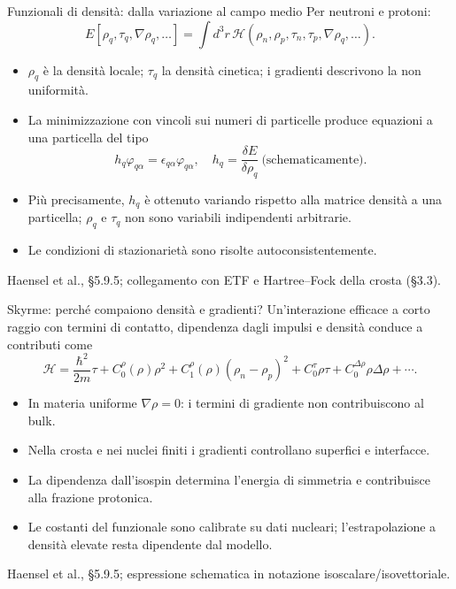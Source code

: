 \begin{frame}[t]{Funzionali di densità: dalla variazione al campo medio}
\small
Per neutroni e protoni:
\[
E[\rho_q,\tau_q,\nabla\rho_q,\ldots]
=\int d^3r\,\mathcal H(\rho_n,\rho_p,\tau_n,\tau_p,\nabla\rho_q,\ldots).
\]
\begin{itemize}
\item $\rho_q$ è la densità locale; $\tau_q$ la densità cinetica; i gradienti descrivono la non uniformità.
\item La minimizzazione con vincoli sui numeri di particelle produce equazioni a una particella del tipo
\[
h_q\varphi_{q\alpha}=\epsilon_{q\alpha}\varphi_{q\alpha},
\quad h_q=\frac{\delta E}{\delta \rho_q}\ \text{(schematicamente)}.
\]
\item Più precisamente, $h_q$ è ottenuto variando rispetto alla matrice densità a una particella; $\rho_q$ e $\tau_q$ non sono variabili indipendenti arbitrarie.
\item Le condizioni di stazionarietà sono risolte autoconsistentemente.
\end{itemize}
{\footnotesize Haensel et al., §5.9.5; collegamento con ETF e Hartree--Fock della crosta (§3.3).}
\end{frame}

\begin{frame}[t]{Skyrme: perché compaiono densità e gradienti?}
\small
Un'interazione efficace a corto raggio con termini di contatto, dipendenza dagli impulsi e densità conduce a contributi come
\[
\mathcal H=\frac{\hbar^2}{2m}\tau
+C_0^\rho(\rho)\rho^2+C_1^\rho(\rho)(\rho_n-\rho_p)^2
+C_0^\tau\rho\tau+C_0^{\Delta\rho}\rho\Delta\rho+\cdots .
\]
\begin{itemize}
\item In materia uniforme $\nabla\rho=0$: i termini di gradiente non contribuiscono al bulk.
\item Nella crosta e nei nuclei finiti i gradienti controllano superfici e interfacce.
\item La dipendenza dall'isospin determina l'energia di simmetria e contribuisce alla frazione protonica.
\item Le costanti del funzionale sono calibrate su dati nucleari; l'estrapolazione a densità elevate resta dipendente dal modello.
\end{itemize}
{\footnotesize Haensel et al., §5.9.5; espressione schematica in notazione isoscalare/isovettoriale.}
\end{frame}

